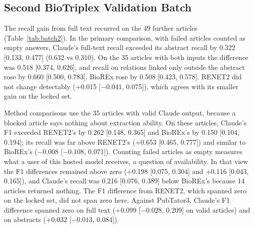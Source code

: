\documentclass[preprint,10pt,letterpaper]{elsarticle}
\begin{document}
\subsection{Second BioTriplex Validation Batch}
The recall gain from full text recurred on the 49 further articles (Table~\ref{tab:batch2}). In the primary comparison, with failed articles counted as empty answers, Claude's full-text recall exceeded its abstract recall by 0.322 [0.133, 0.477] (0.632 vs 0.310). On the 35 articles with both inputs the difference was 0.518 [0.374, 0.626], and recall on relations linked only outside the abstract rose by 0.660 [0.500, 0.783]. BioREx rose by 0.508 [0.423, 0.578]. RENET2 did not change detectably (+0.015 [$-0.041$, 0.075]), which agrees with its smaller gain on the locked set.

Method comparisons use the 35 articles with valid Claude output, because a blocked article says nothing about extraction ability. On these articles, Claude's F1 exceeded RENET2's by 0.262 [0.148, 0.365] and BioREx's by 0.150 [0.104, 0.194]; its recall was far above RENET2's (+0.653 [0.465, 0.777]) and similar to BioREx's ($-0.008$ [$-0.108$, 0.071]). Counting failed articles as empty measures what a user of this hosted model receives, a question of availability. In that view the F1 differences remained above zero (+0.198 [0.075, 0.304] and +0.116 [0.043, 0.165]), and Claude's recall was 0.216 [0.076, 0.389] below BioREx's because 14 articles returned nothing. The F1 difference from RENET2, which spanned zero on the locked set, did not span zero here. Against PubTator3, Claude's F1 difference spanned zero on full text (+0.099 [$-0.028$, 0.209] on valid articles) and on abstracts (+0.032 [$-0.013$, 0.084]).
\end{document}
